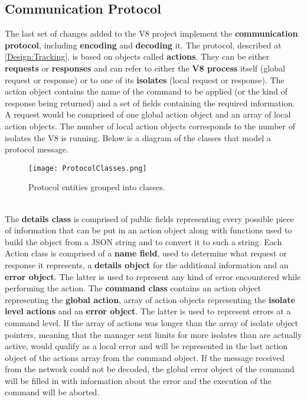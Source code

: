 \documentclass{l4proj}
\begin{document}
\subsection{Communication Protocol}
\hspace*{3em} The last set of changes added to the V8 project implement the \textbf{communication protocol}, including \textbf{encoding} and \textbf{decoding} it. The protocol, described at \ref{Design:Tracking}, is based on objects called \textbf{actions}. They can be either \textbf{requests} or \textbf{responses} and can refer to either the \textbf{V8 process} itself (global request or response) or to one of its \textbf{isolates} (local request or response). The action object contains the name of the command to be applied (or the kind of response being returned) and a set of fields containing the required information. A request would be comprised of one global action object and an array of local action objects. The number of local action objects corresponds to the number of isolates the V8 is running. Below is a diagram of the classes that model a protocol message.     
\begin{figure}[!ht]
  \centering
    \texttt{[image: ProtocolClasses.png]}
  \caption{Protocol entities grouped into classes.}
\end{figure}
\\
\hspace*{3em} The \textbf{details class} is comprised of public fields representing every possible piece of information that can be put in an action object along with functions used to build the object from a JSON string and to convert it to such a string. Each Action class is comprised of a \textbf{name field}, used to determine what request or response it represents, a \textbf{details object} for the additional information and an \textbf{error object}. The latter is used to represent any kind of error encountered while performing the action. The \textbf{command class} contains an action object representing the \textbf{global action}, array of action objects representing the \textbf{isolate level actions} and an \textbf{error object}. The latter is used to represent errors at a command level. If the array of actions was longer than the array of isolate object pointers, meaning that the manager sent limits for more isolates than are actually active, would qualify as a local error and will be represented in the last action object of the actions array from the command object. If the message received from the network could not be decoded, the global error object of the command will be filled in with information about the error and the execution of the command will be aborted.
\end{document}
